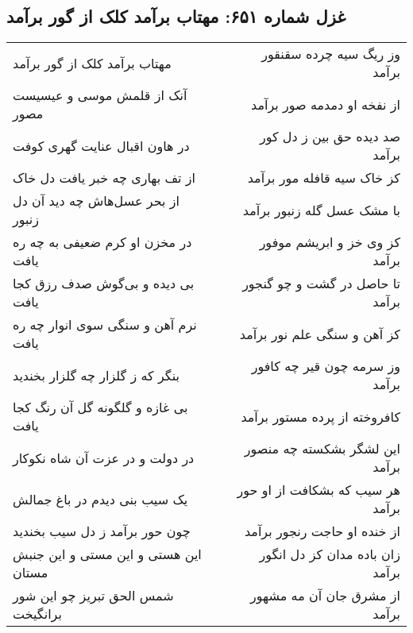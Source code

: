 \begin{center}
\section*{غزل شماره ۶۵۱: مهتاب برآمد کلک از گور برآمد}
\label{sec:0651}
\begin{longtable}{l p{0.5cm} r}
مهتاب برآمد کلک از گور برآمد
&&
وز ریگ سیه چرده سقنقور برآمد
\\
آنک از قلمش موسی و عیسیست مصور
&&
از نفخه او دمدمه صور برآمد
\\
در هاون اقبال عنایت گهری کوفت
&&
صد دیده حق بین ز دل کور برآمد
\\
از تف بهاری چه خبر یافت دل خاک
&&
کز خاک سیه قافله مور برآمد
\\
از بحر عسل‌هاش چه دید آن دل زنبور
&&
با مشک عسل گله زنبور برآمد
\\
در مخزن او کرم ضعیفی به چه ره یافت
&&
کز وی خز و ابریشم موفور برآمد
\\
بی دیده و بی‌گوش صدف رزق کجا یافت
&&
تا حاصل در گشت و چو گنجور برآمد
\\
نرم آهن و سنگی سوی انوار چه ره یافت
&&
کز آهن و سنگی علم نور برآمد
\\
بنگر که ز گلزار چه گلزار بخندید
&&
وز سرمه چون قیر چه کافور برآمد
\\
بی غازه و گلگونه گل آن رنگ کجا یافت
&&
کافروخته از پرده مستور برآمد
\\
در دولت و در عزت آن شاه نکوکار
&&
این لشگر بشکسته چه منصور برآمد
\\
یک سیب بنی دیدم در باغ جمالش
&&
هر سیب که بشکافت از او حور برآمد
\\
چون حور برآمد ز دل سیب بخندید
&&
از خنده او حاجت رنجور برآمد
\\
این هستی و این مستی و این جنبش مستان
&&
زان باده مدان کز دل انگور برآمد
\\
شمس الحق تبریز چو این شور برانگیخت
&&
از مشرق جان آن مه مشهور برآمد
\\
\end{longtable}
\end{center}
